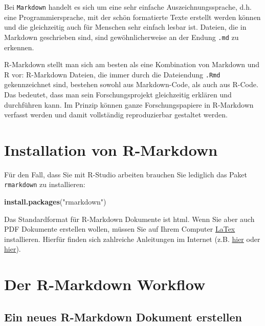 \documentclass[]{tufte-book}
\newenvironment{Shaded}{}{}
\newcommand{\KeywordTok}[1]{\textcolor[rgb]{0.00,0.44,0.13}{\textbf{#1}}}
\newcommand{\StringTok}[1]{\textcolor[rgb]{0.25,0.44,0.63}{#1}}
\newcommand{\NormalTok}[1]{#1}
\begin{document}
Bei \texttt{Markdown} handelt es sich um eine sehr einfache
Auszeichnungssprache, d.h. eine Programmiersprache, mit der schön
formatierte Texte erstellt werden können und die gleichzeitig auch für
Menschen sehr einfach lesbar ist. Dateien, die in Markdown geschrieben
sind, sind gewöhnlicherweise an der Endung \texttt{.md} zu erkennen.

R-Markdown stellt man sich am besten als eine Kombination von Markdown
und R vor: R-Markdown Dateien, die immer durch die Dateiendung
\texttt{.Rmd} gekennzeichnet sind, bestehen sowohl aus Markdown-Code,
als auch aus R-Code. Das bedeutet, dass man sein Forschungsprojekt
gleichzeitig erklären und durchführen kann. Im Prinzip können ganze
Forschungspapiere in R-Markdown verfasst werden und damit vollständig
reproduzierbar gestaltet werden.

\section{Installation von R-Markdown}\label{installation-von-r-markdown}

Für den Fall, dass Sie mit R-Studio arbeiten brauchen Sie lediglich das
Paket \texttt{rmarkdown} zu installieren:

\begin{Shaded}
\begin{Highlighting}[]
\KeywordTok{install.packages}\NormalTok{(}\StringTok{"rmarkdown"}\NormalTok{)}
\end{Highlighting}
\end{Shaded}

Das Standardformat für R-Markdown Dokumente ist html. Wenn Sie aber auch
PDF Dokumente erstellen wollen, müssen Sie auf Ihrem Computer
\href{https://www.latex-project.org/}{LaTex} installieren. Hierfür
finden sich zahlreiche Anleitungen im Internet (z.B.
\href{https://www.latex-tutorial.com/installation/}{hier} oder
\href{https://www.latex-project.org/get/}{hier}).

\section{Der R-Markdown Workflow}\label{der-r-markdown-workflow}

\subsection{Ein neues R-Markdown Dokument
erstellen}\label{ein-neues-r-markdown-dokument-erstellen}
\end{document}
